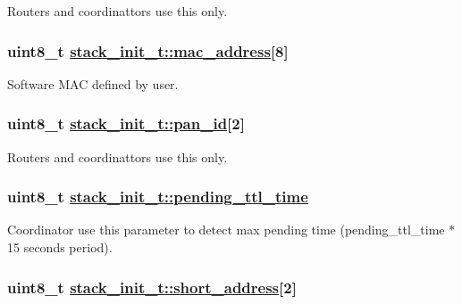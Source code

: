 Routers and coordinattors use this only. \hypertarget{structstack__init__t_e19c2be8fe2556624797d574f870626d}{
\subsubsection[mac\_\-address]{\setlength{\rightskip}{0pt plus 5cm}uint8\_\-t \hyperlink{structstack__init__t_e19c2be8fe2556624797d574f870626d}{stack\_\-init\_\-t::mac\_\-address}\mbox{[}8\mbox{]}}}
\label{structstack__init__t_e19c2be8fe2556624797d574f870626d}


Software MAC defined by user. \hypertarget{structstack__init__t_0b3e8601ce7872c7f84e6cca0578df99}{
\subsubsection[pan\_\-id]{\setlength{\rightskip}{0pt plus 5cm}uint8\_\-t \hyperlink{structstack__init__t_0b3e8601ce7872c7f84e6cca0578df99}{stack\_\-init\_\-t::pan\_\-id}\mbox{[}2\mbox{]}}}
\label{structstack__init__t_0b3e8601ce7872c7f84e6cca0578df99}


Routers and coordinattors use this only. \hypertarget{structstack__init__t_2b6a33578db7e0963d6c33431dd19c1d}{
\subsubsection[pending\_\-ttl\_\-time]{\setlength{\rightskip}{0pt plus 5cm}uint8\_\-t \hyperlink{structstack__init__t_2b6a33578db7e0963d6c33431dd19c1d}{stack\_\-init\_\-t::pending\_\-ttl\_\-time}}}
\label{structstack__init__t_2b6a33578db7e0963d6c33431dd19c1d}


Coordinator use this parameter to detect max pending time (pending\_\-ttl\_\-time $\ast$ 15 seconds period). \hypertarget{structstack__init__t_05a9f2e4bedbe10b126a776c42e00194}{
\subsubsection[short\_\-address]{\setlength{\rightskip}{0pt plus 5cm}uint8\_\-t \hyperlink{structstack__init__t_05a9f2e4bedbe10b126a776c42e00194}{stack\_\-init\_\-t::short\_\-address}\mbox{[}2\mbox{]}}}
\label{structstack__init__t_05a9f2e4bedbe10b126a776c42e00194}


